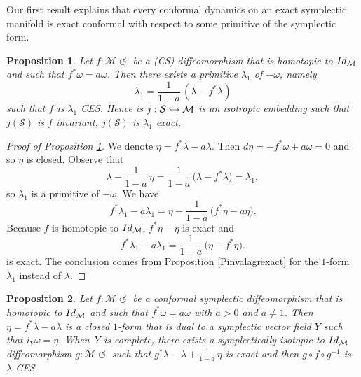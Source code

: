 \documentclass[11pt]{article}
\numberwithin{equation}{section}
\numberwithin{figure}{section}
\numberwithin{table}{section}
\def\hto{\mathrel{\lhook\joinrel\to}}
\providecommand{\righttoleftarrow}{\mathrel{\circlearrowleft}}
\newtheorem{proposition}{Proposition}
\theoremstyle{definition}
\def\cM{{\mathcal M}}
\def\cS{{\mathcal S}}
\begin{document}
Our first result explains that every conformal dynamics on an exact symplectic manifold is exact conformal with respect to some primitive of the symplectic form.

\begin{proposition}\label{PLiouvillembedding}
Let $f: \cM \righttoleftarrow$ be a (CS) diffeomorphism that is homotopic to ${\rm Id}_{\cM}$ and such that $f^*\omega=a\omega$. Then there exists a primitive $\lambda_1$ of $-\omega$, namely\vspace*{-3pt}
\[
\lambda_1=\frac{1}{1-a}\,(\lambda-f^*\lambda)
\]
such that $f$ is $\lambda_1$ CES. Hence is $j:\cS\hto\cM$ is an isotropic embedding such that $j(\cS)$ is $f$ invariant, $j(\cS)$ is $\lambda_1$ exact.
\end{proposition}

\begin{proof}[Proof of Proposition \ref{PLiouvillembedding}]
We denote $\eta=f^*\lambda-a\lambda$. Then $d\eta=-f^*\omega+a\omega=0$ and so $\eta$ is closed. Observe that\vspace*{-3pt}
\[
\lambda-\frac{1}{1-a}\,\eta=\frac{1}{1-a}\,\big(\lambda-f^*\lambda)=\lambda_1,
\]
so $\lambda_1$ is a primitive of $-\omega$. We have\vspace*{-3pt}
\[
f^*\lambda_1-a\lambda_1=\eta-\frac{1}{1-a}\,\big(f^*\eta-a\eta\big).
\]
Because $f$ is homotopic to ${\rm Id}_\cM$, $f^*\eta-\eta$ is exact and\vspace*{-3pt}
\[
f^*\lambda_1-a\lambda_1=\frac{1}{1-a}\,\big( \eta-f^*\eta\big).
\]
is exact. The conclusion comes from Proposition \ref{Pinvalagrexact} for the $1$-form $\lambda_1$ instead of $\lambda$.
\end{proof}

\begin{proposition}\label{PCES}
Let $f: \cM \righttoleftarrow$ be a conformal symplectic diffeomorphism that is homotopic to ${\rm Id}_\cM$ and such that $f^*\omega=a\omega$ with $a>0$ and $a\not=1$. Then $\eta=f^*\lambda-a\lambda$ is a closed $1$-form that is dual to a symplectic vector field $Y$ such that $i_Y\omega=\eta.$ When~$Y$ is complete, there exists a symplectically isotopic to ${\rm Id}_\cM$ diffeomorphism $g: \cM \righttoleftarrow$ such that $g^*\lambda-\lambda +\frac{1}{1-a}\,\eta$ is exact and then $g\circ f\circ g^{-1}$ is $\lambda$ CES.
\end{proposition}
\end{document}
